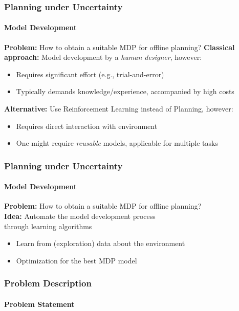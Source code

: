 \begin{frame}
	\frametitle{Planning under Uncertainty}
	\framesubtitle{Model Development}
	
	\textcolor{tudBlack}{\textbf{Problem:}} How to obtain a suitable MDP for offline planning?
	\pause
	\vfill
	\textcolor{tudBlack}{\textbf{Classical approach:}} Model development by a \textit{human designer}, however:
	\begin{itemize}
		\item Requires significant effort (e.g., trial-and-error)
		\item Typically demands knowledge/experience, accompanied by high costs
	\end{itemize}
	\pause
	\vfill
	\textcolor{tudBlack}{\textbf{Alternative:}} Use Reinforcement Learning instead of Planning, however:
	\begin{itemize}
		\item Requires direct interaction with environment %
		\item One might require \textit{reusable} models, applicable for multiple tasks %
	\end{itemize}
\end{frame}

\begin{frame}[t]
	\frametitle{Planning under Uncertainty}
	\framesubtitle{Model Development}
	\vspace{8pt}
	\textcolor{tudBlack}{\textbf{Problem:}} How to obtain a suitable MDP for offline planning?\\
	\vspace{14pt}
	\textcolor{tudblue}{\textbf{Idea:}} Automate the model development process \\through learning algorithms 
	\begin{itemize}
		\item Learn from (exploration) data about the environment
		\item Optimization for the best MDP model
	\end{itemize}

\end{frame}

\begin{frame}
\frametitle{Problem Description}
\framesubtitle{Problem Statement}



\end{frame}

